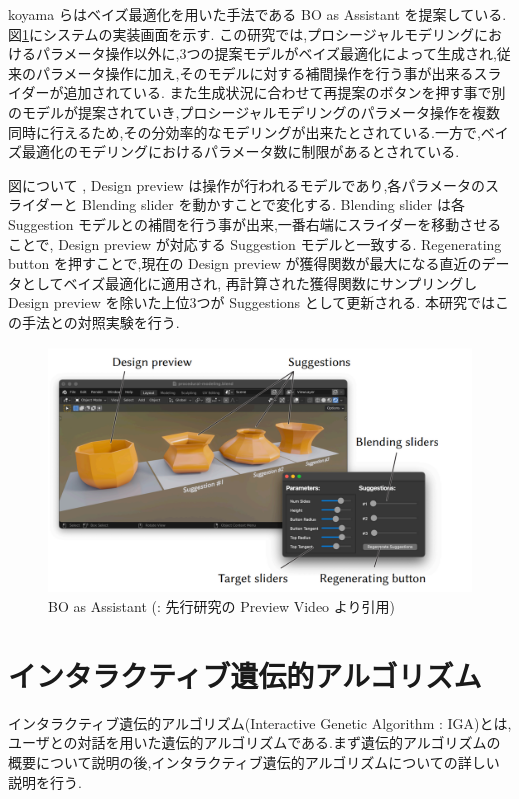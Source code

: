 koyama らはベイズ最適化を用いた手法である BO as Assistant \cite{koyama2022bo}を提案している.図\ref{fig:boAssistant1}にシステムの実装画面を示す.
この研究では,プロシージャルモデリングにおけるパラメータ操作以外に,3つの提案モデルがベイズ最適化によって生成され,従来のパラメータ操作に加え,そのモデルに対する補間操作を行う事が出来るスライダーが追加されている.
また生成状況に合わせて再提案のボタンを押す事で別のモデルが提案されていき,プロシージャルモデリングのパラメータ操作を複数同時に行えるため,その分効率的なモデリングが出来たとされている.一方で,ベイズ最適化のモデリングにおけるパラメータ数に制限があるとされている.

図について
, Design preview は操作が行われるモデルであり,各パラメータのスライダーと Blending slider を動かすことで変化する. Blending slider は各 Suggestion モデルとの補間を行う事が出来,一番右端にスライダーを移動させることで, Design preview が対応する Suggestion モデルと一致する. Regenerating button を押すことで,現在の Design preview が獲得関数が最大になる直近のデータとしてベイズ最適化に適用され, 
再計算された獲得関数にサンプリングし Design preview を除いた上位3つが Suggestions として更新される.
本研究ではこの手法との対照実験を行う.

\begin{figure}[h]
	\begin{center}
		\includegraphics[scale=0.7]{./imgs/boAssistant1.png}
		\caption[BO as Assistant]{BO as Assistant (: 先行研究\cite{koyama2022bo}の Preview Video より引用\label{fig:boAssistant1})}
	\end{center}
\end{figure}


\newpage

\section{インタラクティブ遺伝的アルゴリズム}
  インタラクティブ遺伝的アルゴリズム(Interactive Genetic Algorithm : IGA)とは,ユーザとの対話を用いた遺伝的アルゴリズムである.まず遺伝的アルゴリズムの概要について説明の後,インタラクティブ遺伝的アルゴリズムについての詳しい説明を行う.

